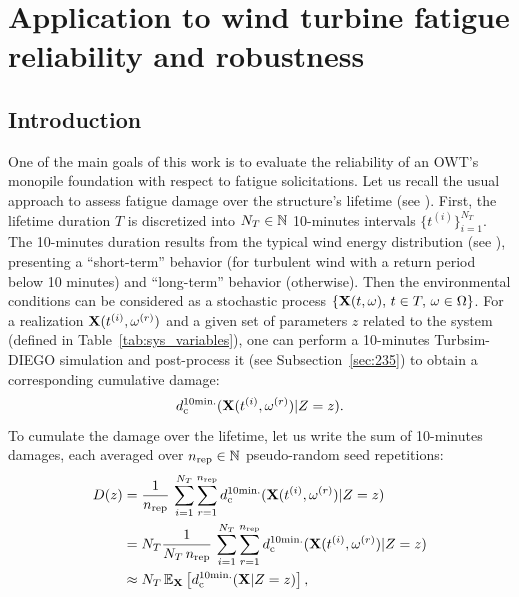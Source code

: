 \cleardoublepage
\chapter{Application to wind turbine fatigue reliability and robustness}
\label{chpt:7}
\hfill
\localtableofcontents
\newpage

\section{Introduction}
One of the main goals of this work is to evaluate the reliability of an OWT's monopile foundation with respect to fatigue solicitations. 
Let us recall the usual approach to assess fatigue damage over the structure's lifetime (see \citealp[Appendix H]{iec_2019}). 
First, the lifetime duration $T$ is discretized into $N_T \in \mathbb{N}$ 10-minutes intervals $\{t^{(i)}\}_{i=1}^{N_T}$. 
The 10-minutes duration results from the typical wind energy distribution (see ), presenting a ``short-term'' behavior (for turbulent wind with a return period below 10 minutes) and ``long-term'' behavior (otherwise).
Then the environmental conditions can be considered as a stochastic process $\{{\bf X}(t, \omega), \, t \in T, \, \omega \in \Omega\}$.%
For a realization ${\bf X}(t^{(i)}, \omega^{(r)})$ and a given set of parameters $z$ related to the system (defined in Table~\ref{tab:sys_variables}), one can perform a 10-minutes Turbsim-DIEGO simulation and post-process it (see Subsection~\ref{sec:235}) to obtain a corresponding cumulative damage:
\begin{equation}
    d_{\mathrm{c}}^{10\mathrm{min.}}({\bf X}(t^{(i)}, \omega^{(r)})|Z=z). 
\end{equation}
To cumulate the damage over the lifetime, let us write the sum of 10-minutes damages, each averaged over $n_{\mathrm{rep}} \in \mathbb{N}$ pseudo-random seed repetitions: 
\begin{subequations}
    \begin{align}
        D(z) &= \frac{1}{n_{\mathrm{rep}}} \, \sum_{i=1}^{N_T} \sum_{r=1}^{n_{\mathrm{rep}}} d_{\mathrm{c}}^{10\mathrm{min.}}({\bf X}(t^{(i)}, \omega^{(r)})|Z=z)\\
             &= N_T \frac{1}{N_T \, n_{\mathrm{rep}}} \, \sum_{i=1}^{N_T} \sum_{r=1}^{n_{\mathrm{rep}}} d_{\mathrm{c}}^{10\mathrm{min.}}({\bf X}(t^{(i)}, \omega^{(r)})|Z=z)\\
             &\approx N_T \, \mathbb{E}_{{\bf X}}\left[d_{\mathrm{c}}^{10\mathrm{min.}}({\bf X}|Z=z)\right],
             \label{eq:expected_damage}
    \end{align}
\end{subequations}

